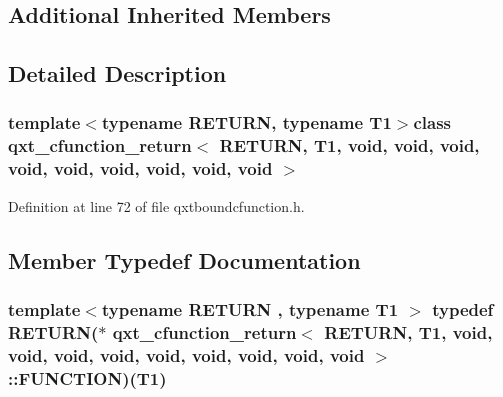 \subsection*{Additional Inherited Members}


\subsection{Detailed Description}
\subsubsection*{template$<$typename R\-E\-T\-U\-R\-N, typename T1$>$class qxt\-\_\-cfunction\-\_\-return$<$ R\-E\-T\-U\-R\-N, T1, void, void, void, void, void, void, void, void, void $>$}



Definition at line 72 of file qxtboundcfunction.\-h.



\subsection{Member Typedef Documentation}
\hypertarget{classqxt__cfunction__return_3_01_r_e_t_u_r_n_00_01_t1_00_01void_00_01void_00_01void_00_01void_004b10d2090ecf78481943e8d18babd4cd_a6b0605f75147dccc39454cadf00569ce}{
\subsubsection[{F\-U\-N\-C\-T\-I\-O\-N}]{\setlength{\rightskip}{0pt plus 5cm}template$<$typename R\-E\-T\-U\-R\-N , typename T1 $>$ typedef R\-E\-T\-U\-R\-N($\ast$ {\bf qxt\-\_\-cfunction\-\_\-return}$<$ R\-E\-T\-U\-R\-N, T1, {\bf void}, {\bf void}, {\bf void}, {\bf void}, {\bf void}, {\bf void}, {\bf void}, {\bf void}, {\bf void} $>$\-::F\-U\-N\-C\-T\-I\-O\-N)(T1)}}\label{classqxt__cfunction__return_3_01_r_e_t_u_r_n_00_01_t1_00_01void_00_01void_00_01void_00_01void_004b10d2090ecf78481943e8d18babd4cd_a6b0605f75147dccc39454cadf00569ce}


